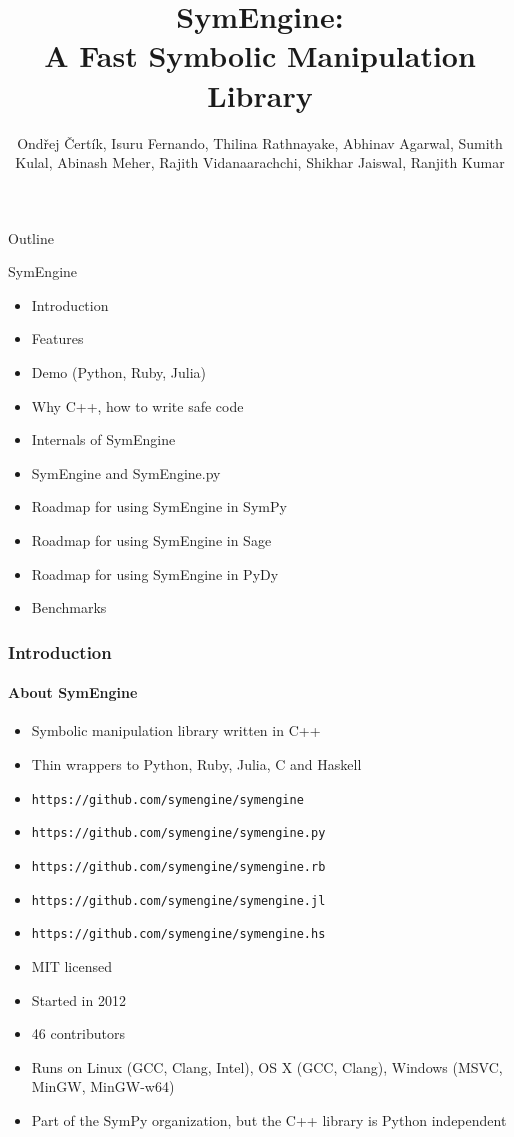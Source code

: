 \documentclass{beamer}
\title[SymEngine \hspace{14em}\insertframenumber/
\inserttotalframenumber]{SymEngine: \\A Fast Symbolic Manipulation Library}
\author[O. Čertík, I. Fernando, ...]{Ondřej Čertík, Isuru Fernando, Thilina Rathnayake, Abhinav Agarwal, Sumith Kulal, Abinash Meher, Rajith Vidanaarachchi, Shikhar Jaiswal, Ranjith Kumar}
\begin{document}
\begin{frame}
\maketitle
\end{frame}


\begin{frame}{Outline}
\begin{block}{SymEngine}
\begin{itemize}
\item Introduction
\item Features
\item Demo (Python, Ruby, Julia)
\item Why C++, how to write safe code
\item Internals of SymEngine
\item SymEngine and SymEngine.py
\item Roadmap for using SymEngine in SymPy
\item Roadmap for using SymEngine in Sage
\item Roadmap for using SymEngine in PyDy
\item Benchmarks
\end{itemize}
\end{block}
\end{frame}


\begin{frame}
\frametitle{Introduction}
\framesubtitle{About SymEngine}
\begin{itemize}
\item Symbolic manipulation library written in C++
\item Thin wrappers to Python, Ruby, Julia, C and Haskell
\item \texttt{https://github.com/symengine/symengine}
\item \texttt{https://github.com/symengine/symengine.py}
\item \texttt{https://github.com/symengine/symengine.rb}
\item \texttt{https://github.com/symengine/symengine.jl}
\item \texttt{https://github.com/symengine/symengine.hs}
\item MIT licensed
\item Started in 2012
\item 46 contributors
\item Runs on Linux (GCC, Clang, Intel), OS X (GCC, Clang), Windows (MSVC,
    MinGW, MinGW-w64)
\item Part of the SymPy organization, but the C++ library is Python independent
\end{itemize}
\end{frame}
\end{document}
